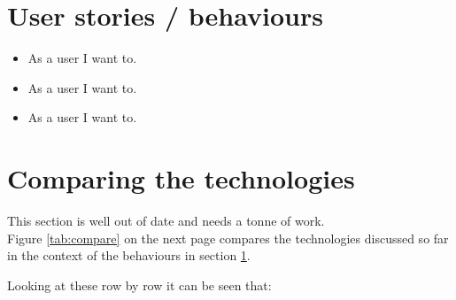 \section{User stories / behaviours}
\label{behaviours}

\begin{itemize}
\item As a user I want to.
\item As a user I want to.
\item As a user I want to.
\end{itemize}

\section{Comparing the technologies}
This section is well out of date and needs a tonne of work.\\
Figure \ref{tab:compare} on the next page compares the technologies discussed so far in the context of the behaviours in section \ref{behaviours}. \par
Looking at these row by row it can be seen that:\par\
